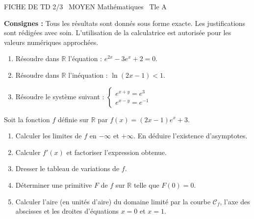 \documentclass[11pt]{article}
\begin{document}
\begin{tcolorbox}[enhanced,colback=popink,colframe=popink,arc=10pt,boxrule=0pt,left=12pt,right=12pt,top=9pt,bottom=9pt]
{\color{white}\popxbold\small FICHE DE TD 2/3 \textbullet\ MOYEN \hfill Mathématiques \textbullet\ Tle A\par}
\end{tcolorbox}
\vspace{4pt}
\noindent\textbf{Consignes :} Tous les résultats sont donnés sous forme exacte. Les justifications sont rédigées avec soin. L'utilisation de la calculatrice est autorisée pour les valeurs numériques approchées.

\begin{exercice}
\begin{enumerate}
    \item Résoudre dans $\mathbb{R}$ l'équation : $e^{2x} - 3e^{x} + 2 = 0$.
    \item Résoudre dans $\mathbb{R}$ l'inéquation : $\ln(2x - 1) < 1$.
    \item Résoudre le système suivant :
    $\begin{cases}
    e^{x+y} = e^3 \\
    e^{x-y} = e^{-1}
    \end{cases}$
\end{enumerate}
\end{exercice}

\begin{exercice}
Soit la fonction $f$ définie sur $\mathbb{R}$ par $f(x) = (2x - 1)e^{x} + 3$.
\begin{enumerate}
    \item Calculer les limites de $f$ en $-\infty$ et $+\infty$. En déduire l'existence d'asymptotes.
    \item Calculer $f'(x)$ et factoriser l'expression obtenue.
    \item Dresser le tableau de variations de $f$.
    \item Déterminer une primitive $F$ de $f$ sur $\mathbb{R}$ telle que $F(0) = 0$.
    \item Calculer l'aire (en unités d'aire) du domaine limité par la courbe $\mathcal{C}_f$, l'axe des abscisses et les droites d'équations $x = 0$ et $x = 1$.
\end{enumerate}
\end{exercice}
\end{document}
